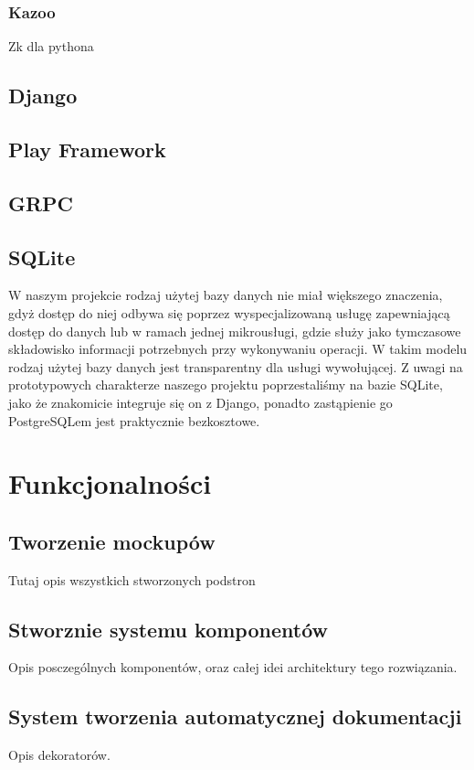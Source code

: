 \documentclass[licencjacka]{pracamgr}
\begin{document}
\subsection{Kazoo}
Zk dla pythona

\section{Django}

\section{Play Framework}

\section{GRPC}

\section{SQLite}

W naszym projekcie rodzaj użytej bazy danych nie miał większego znaczenia, gdyż dostęp do niej odbywa się poprzez
wyspecjalizowaną usługę zapewniającą dostęp do danych lub w ramach jednej mikrousługi, gdzie służy jako tymczasowe
składowisko informacji potrzebnych przy wykonywaniu operacji. W takim modelu rodzaj użytej bazy danych jest
transparentny dla usługi wywołującej. Z uwagi na prototypowych charakterze naszego projektu poprzestaliśmy na
bazie SQLite, jako że znakomicie integruje się on z Django, ponadto zastąpienie go PostgreSQLem jest praktycznie bezkosztowe.

\chapter{Funkcjonalności}\label{r:fun}

\section{Tworzenie mockupów}
Tutaj opis wszystkich stworzonych podstron
\section{Stworznie systemu komponentów}
Opis posczególnych komponentów, oraz całej idei architektury tego rozwiązania.
\section{System tworzenia automatycznej dokumentacji}
Opis dekoratorów.
\end{document}
